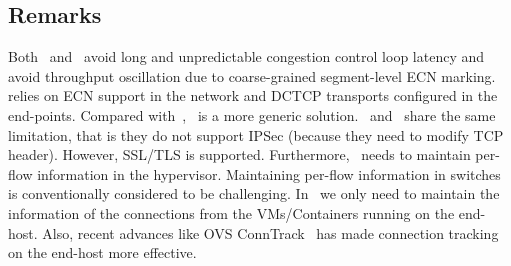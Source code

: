 \subsection{Remarks}
Both~\dem{} and~\spring{} avoid long and unpredictable congestion control loop latency and avoid throughput oscillation due to 
coarse-grained segment-level ECN marking.~\dem{} relies on ECN support in the network and DCTCP transports configured in
the end-points. Compared with~\dem{},~\spring{} is a more generic solution.~\dem{} and~\spring{} share the same limitation, that is
they do not support IPSec (because they need to modify TCP header). However, SSL/TLS is supported. 
Furthermore,~\spring{} needs to maintain per-flow information in the hypervisor. 
Maintaining per-flow information in switches is conventionally considered to be challenging.
In~\spring{} we only need to maintain the information of the connections from the VMs/Containers running on the end-host. 
Also, recent advances like OVS ConnTrack~\cite{ovs-conntrack} has made connection tracking on the end-host more effective. 
